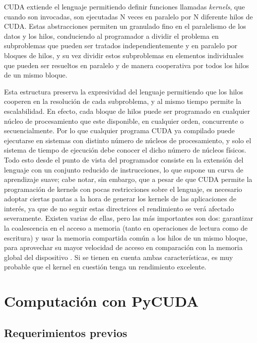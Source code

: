 \documentclass[twocolumn,twoside]{Jornadas}
\begin{document}
CUDA extiende el lenguaje permitiendo definir funciones llamadas \emph{kernels}, que cuando son invocadas, son ejecutadas N veces en paralelo por N diferente hilos de CUDA. Estas abstracciones permiten un granulado fino en el paralelismo de los datos y los hilos, conduciendo al programador a dividir el problema en subproblemas que pueden ser tratados independientemente y en paralelo por bloques de hilos, y su vez dividir estos subproblemas en elementos individuales que pueden ser resueltos en paralelo y de manera cooperativa por todos los hilos de un mismo bloque.


Esta estructura preserva la expresividad del lenguaje permitiendo que los hilos cooperen en la resolución de cada subproblema, y al mismo tiempo permite la escalabilidad. En efecto, cada bloque de hilos puede ser programado en cualquier núcleo de procesamiento que este disponible, en cualquier orden, concurrente o secuencialmente. Por lo que cualquier programa CUDA ya compilado puede ejecutarse en sistemas con distinto número de núcleos de procesamiento, y solo el sistema de tiempo de ejecución debe conocer el dicho número de núcleos físicos. Todo esto desde el punto de vista del programador consiste en la extensión del lenguaje con un conjunto reducido de instrucciones, lo que supone un curva de aprendizaje suave; cabe notar, sin embargo, que a pesar de que CUDA permite la programación de kernels con pocas restricciones sobre el lenguaje, es necesario adoptar ciertas pautas a la hora de generar los kernels de las aplicaciones de interés, ya que de no seguir estas directrices el rendimiento se verá afectado severamente. Existen varias de ellas, pero las más importantes son dos: garantizar la coalescencia en el acceso a memoria (tanto en operaciones de lectura como de escritura) y usar la memoria compartida común a los hilos de un mismo bloque, para aprovechar su mayor velocidad de acceso en comparación con la memoria global del dispositivo \cite{cbestpractices}. Si se tienen en cuenta ambas características, es muy probable que el kernel en cuestión tenga un rendimiento excelente.

\section{Computación con PyCUDA}

\subsection{Requerimientos previos}
\end{document}
